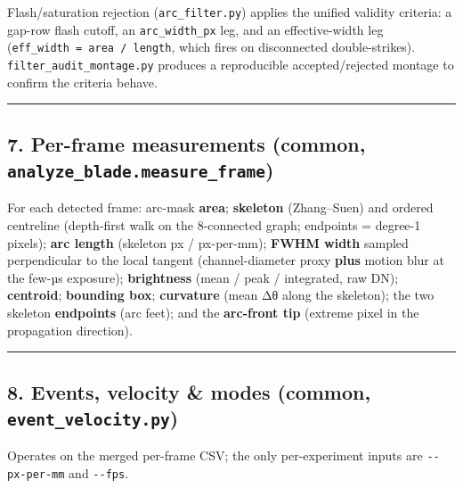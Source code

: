 \documentclass[
  11pt,
]{article}
\begin{document}
Flash/saturation rejection (\texttt{arc\_filter.py}) applies the unified
validity criteria: a gap-row flash cutoff, an \texttt{arc\_width\_px}
leg, and an effective-width leg
(\texttt{eff\_width\ =\ area\ /\ length}, which fires on disconnected
double-strikes). \texttt{filter\_audit\_montage.py} produces a
reproducible accepted/rejected montage to confirm the criteria behave.

\begin{center}\rule{0.5\linewidth}{0.5pt}\end{center}

\hypertarget{7-per-frame-measurements-common-analyze_blademeasure_frame}{%
\subsection{\texorpdfstring{7. Per-frame measurements (common,
\texttt{analyze\_blade.measure\_frame})}{7. Per-frame measurements (common, analyze\_blade.measure\_frame)}}\label{7-per-frame-measurements-common-analyze_blademeasure_frame}}

For each detected frame: arc-mask \textbf{area}; \textbf{skeleton}
(Zhang--Suen) and ordered centreline (depth-first walk on the
8-connected graph; endpoints = degree-1 pixels); \textbf{arc length}
(skeleton px / px-per-mm); \textbf{FWHM width} sampled perpendicular to
the local tangent (channel-diameter proxy \textbf{plus} motion blur at
the few-µs exposure); \textbf{brightness} (mean / peak / integrated, raw
DN); \textbf{centroid}; \textbf{bounding box}; \textbf{curvature} (mean
\textbar Δθ\textbar{} along the skeleton); the two skeleton
\textbf{endpoints} (arc feet); and the \textbf{arc-front tip} (extreme
pixel in the propagation direction).

\begin{center}\rule{0.5\linewidth}{0.5pt}\end{center}

\hypertarget{8-events-velocity--modes-common-event_velocitypy}{%
\subsection{\texorpdfstring{8. Events, velocity \& modes (common,
\texttt{event\_velocity.py})}{8. Events, velocity \& modes (common, event\_velocity.py)}}\label{8-events-velocity--modes-common-event_velocitypy}}

Operates on the merged per-frame CSV; the only per-experiment inputs are
\texttt{-\/-px-per-mm} and \texttt{-\/-fps}.
\end{document}
